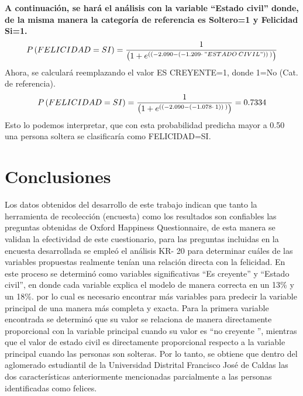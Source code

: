 \documentclass[conference]{IEEEtran}
\begin{document}
\textbf{A continuación, se hará el análisis con la variable “Estado civil” donde, de la misma manera la categoría de referencia es Soltero=1 y Felicidad Si=1.}\\   
\begin{equation}\tiny
P\left(FELICIDAD=SI\right)=\frac{1}{\left(1+e^{\left(\left(-2.090-\left(-1.209\cdot \:"ESTADO\:CIVIL"\right)\right)\:\right)}\right)}
\end{equation}
   Ahora, se calculará reemplazando el valor ES CREYENTE=1, donde 1=No (Cat. de referencia). \\
   \begin{equation}\tiny
 P\left(FELICIDAD=SI\right)=\frac{1}{\left(1+e^{\left(\left(-2.090-\left(-1.078\cdot \:1\right)\right)\:\right)}\right)}=0.7334
 \end{equation}
 Esto lo podemos interpretar, que con esta probabilidad predicha mayor a 0.50 una persona soltera se clasificaría como FELICIDAD=SI.\\
\section{Conclusiones}
  
  Los datos obtenidos del desarrollo de este trabajo   indican que tanto la herramienta de recolección (encuesta) como los resultados son confiables las preguntas obtenidas de Oxford Happiness Questionnaire, de esta manera se validan la efectividad de este cuestionario, para las preguntas incluidas en la encuesta desarrollada se empleó el análisis KR- 20 para determinar cuáles de las variables propuestas realmente tenían una relación directa con la felicidad. En este proceso se determinó como variables significativas “Es creyente” y “Estado civil”, en donde cada variable explica el modelo de manera correcta en un 13\% y un 18\%. por lo cual es necesario encontrar más variables para predecir la variable principal de una manera más completa y exacta. Para la primera variable encontrada se determinó que su valor se relaciona de manera directamente proporcional con la variable principal cuando su valor es “no creyente ”, mientras que el valor de estado civil es directamente proporcional respecto a la variable principal cuando las personas son solteras. Por lo tanto, se obtiene que dentro del aglomerado estudiantil de la Universidad Distrital Francisco José de Caldas las dos características anteriormente mencionadas parcialmente a las personas identificadas como felices.\\
 
\end{document}
